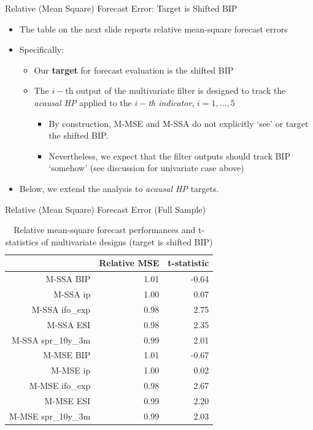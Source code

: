 \documentclass{beamer}
\begin{document}
\begin{frame} {Relative (Mean Square) Forecast Error: Target is Shifted BIP}
\begin{itemize}
\item The table on the next slide reports relative mean-square forecast errors 
\item Specifically:
\begin{itemize}
\item Our \textbf{target} for forecast evaluation is the shifted BIP 
\item The $i-$th output of the multivariate filter is designed to track the \emph{acausal HP} applied to the \emph{$i-$th indicator}, $i=1,...,5$
\begin{itemize}
\item By construction, M-MSE and M-SSA do not explicitly `see' or target the shifted BIP. 
\item Nevertheless, we expect that the filter outputs should track BIP `somehow' (see discussion for univariate case above)
\end{itemize}
\end{itemize}
\item Below, we extend the analysis to \emph{acausal HP} targets.

\end{itemize}
\end{frame}



\begin{frame} {Relative (Mean Square) Forecast Error (Full Sample)}\label{slide_multi_rel_mse}


\begin{table}[ht]
\centering
\begin{tabular}{rrr}
  \hline
 & Relative MSE & t-statistic \\ 
  \hline
M-SSA BIP & 1.01 & -0.64 \\ 
  M-SSA ip & 1.00 & 0.07 \\ 
  M-SSA ifo\_exp & 0.98 & 2.75 \\ 
  M-SSA ESI & 0.98 & 2.35 \\ 
  M-SSA spr\_10y\_3m & 0.99 & 2.01 \\ 
  M-MSE BIP & 1.01 & -0.67 \\ 
  M-MSE ip & 1.00 & 0.02 \\ 
  M-MSE ifo\_exp & 0.98 & 2.67 \\ 
  M-MSE ESI & 0.99 & 2.20 \\ 
  M-MSE spr\_10y\_3m & 0.99 & 2.03 \\ 
   \hline
\end{tabular}
\caption{Relative mean-square forecast performances and t-statistics of multivariate designs (target is shifted BIP)} 
\label{perf_var1}
\end{table}
\end{frame}
\end{document}
